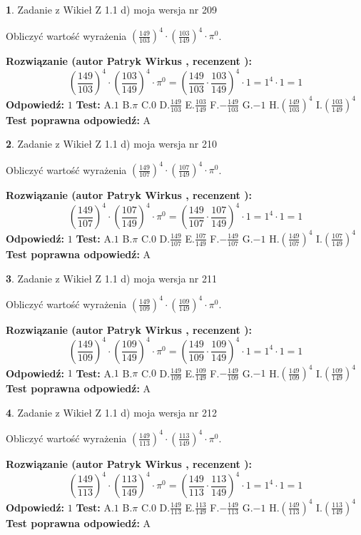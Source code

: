 \documentclass[12pt, a4paper]{article}
\theoremstyle{definition} %
\newtheorem{zad}{}
\newcommand{\zadStart}[1]{\begin{zad}#1\newline}
\newcommand{\zadStop}{\end{zad}}
\newcommand{\rozwStart}[2]{\noindent \textbf{Rozwiązanie (autor #1 , recenzent #2): }\newline}
\newcommand{\rozwStop}{\newline}
\newcommand{\odpStart}{\noindent \textbf{Odpowiedź:}\newline}
\newcommand{\odpStop}{\newline}
\newcommand{\testStart}{\noindent \textbf{Test:}\newline}
\newcommand{\testStop}{\newline}
\newcommand{\kluczStart}{\noindent \textbf{Test poprawna odpowiedź:}\newline}
\newcommand{\kluczStop}{\newline}
\begin{document}
\zadStart{Zadanie z Wikieł Z 1.1 d) moja wersja nr 209}

Obliczyć wartość wyrażenia $(\frac{149}{103})^{4} \cdot (\frac{103}{149})^{4} \cdot \pi^{0}$.
\zadStop
\rozwStart{Patryk Wirkus}{}
$$(\frac{149}{103})^{4} \cdot (\frac{103}{149})^{4} \cdot \pi^{0} = (\frac{149}{103} \cdot \frac{103}{149})^{4} \cdot 1 = 1^{4} \cdot 1 = 1$$
\rozwStop
\odpStart
$1$
\odpStop
\testStart
A.$1$ B.$\pi$ C.$0$ D.$\frac{149}{103}$ E.$\frac{103}{149}$
F.$-\frac{149}{103}$ G.$-1$
H.$(\frac{149}{103})^{4}$
I.$(\frac{103}{149})^{4}$
\testStop
\kluczStart
A
\kluczStop



\zadStart{Zadanie z Wikieł Z 1.1 d) moja wersja nr 210}

Obliczyć wartość wyrażenia $(\frac{149}{107})^{4} \cdot (\frac{107}{149})^{4} \cdot \pi^{0}$.
\zadStop
\rozwStart{Patryk Wirkus}{}
$$(\frac{149}{107})^{4} \cdot (\frac{107}{149})^{4} \cdot \pi^{0} = (\frac{149}{107} \cdot \frac{107}{149})^{4} \cdot 1 = 1^{4} \cdot 1 = 1$$
\rozwStop
\odpStart
$1$
\odpStop
\testStart
A.$1$ B.$\pi$ C.$0$ D.$\frac{149}{107}$ E.$\frac{107}{149}$
F.$-\frac{149}{107}$ G.$-1$
H.$(\frac{149}{107})^{4}$
I.$(\frac{107}{149})^{4}$
\testStop
\kluczStart
A
\kluczStop



\zadStart{Zadanie z Wikieł Z 1.1 d) moja wersja nr 211}

Obliczyć wartość wyrażenia $(\frac{149}{109})^{4} \cdot (\frac{109}{149})^{4} \cdot \pi^{0}$.
\zadStop
\rozwStart{Patryk Wirkus}{}
$$(\frac{149}{109})^{4} \cdot (\frac{109}{149})^{4} \cdot \pi^{0} = (\frac{149}{109} \cdot \frac{109}{149})^{4} \cdot 1 = 1^{4} \cdot 1 = 1$$
\rozwStop
\odpStart
$1$
\odpStop
\testStart
A.$1$ B.$\pi$ C.$0$ D.$\frac{149}{109}$ E.$\frac{109}{149}$
F.$-\frac{149}{109}$ G.$-1$
H.$(\frac{149}{109})^{4}$
I.$(\frac{109}{149})^{4}$
\testStop
\kluczStart
A
\kluczStop



\zadStart{Zadanie z Wikieł Z 1.1 d) moja wersja nr 212}

Obliczyć wartość wyrażenia $(\frac{149}{113})^{4} \cdot (\frac{113}{149})^{4} \cdot \pi^{0}$.
\zadStop
\rozwStart{Patryk Wirkus}{}
$$(\frac{149}{113})^{4} \cdot (\frac{113}{149})^{4} \cdot \pi^{0} = (\frac{149}{113} \cdot \frac{113}{149})^{4} \cdot 1 = 1^{4} \cdot 1 = 1$$
\rozwStop
\odpStart
$1$
\odpStop
\testStart
A.$1$ B.$\pi$ C.$0$ D.$\frac{149}{113}$ E.$\frac{113}{149}$
F.$-\frac{149}{113}$ G.$-1$
H.$(\frac{149}{113})^{4}$
I.$(\frac{113}{149})^{4}$
\testStop
\kluczStart
A
\kluczStop
\end{document}
